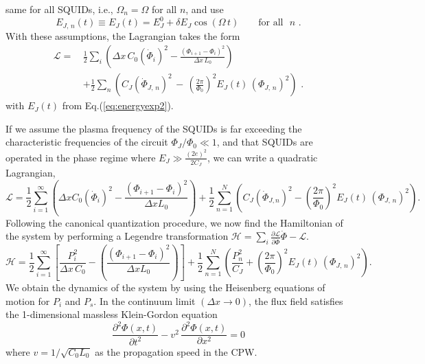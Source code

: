 same for all SQUIDs, i.e., $\Omega_n = \Omega$ for all $n$, and use 
%
\begin{equation} \label{eq:energyexp2}
E_{J,\,n}(t) \equiv E_J(t) = E_J^0 + \delta E_J \cos(\Omega \, t) \qquad \text{for all} \, \, \, \, n \, \, . 
\end{equation}
%
With these assumptions, the Lagrangian takes the form
%
\begin{equation} \label{eq:lagn3}
\begin{split}
\mathcal{L} = \, & \frac{1}{2} \sum_i \left( \Delta x \, C_{0} \left(\dot{\Phi}_{i}\right)^{2} - 
\frac{\left(\Phi_{i+1}-\Phi_{i}\right)^{2}}{\Delta x \, L_{0}} \right)  \\[2mm]
& + \frac{1}{2} \sum_n \left( C_J \left(\dot{\Phi}_{J,\,n} \right)^{2} \, - \, 
 \left(\frac{2 \pi}{\Phi_0} \right)^2 E_J(t) \, \left( \Phi_{J,\,n} \right)^2 
\right) \, \, .
\end{split}
\end{equation}
%
with $E_J(t)$ from Eq.(\ref{eq:energyexp2}). 

\color{black}

If we assume the plasma frequency of the SQUIDs is far exceeding the characteristic frequencies of the circuit
$\Phi_J/\Phi_0 \ll 1$, and that SQUIDs are operated in the phase regime where $E_J \gg \frac{(2e)^2}{2C_J}$, we can write a quadratic Lagrangian, 
%
\begin{equation}
\mathcal{L}=\frac{1}{2}\sum_{i=1}^{\infty}\left(\Delta x C_{0} \left(\dot{\Phi}_{i}\right)^{2} - 
\frac{\left(\Phi_{i+1}-\Phi_{i}\right)^{2}}{\Delta x L_{0}}\right) %
 + \frac{1}{2} \sum_{n=1}^{N}\left(C_J\left(\dot{\Phi}_{J, n}\right)^{2}-\left(\frac{2\pi}{\Phi_{0}}\right)^{2} E_J(t) \, \left( \Phi_{J,\,n} \right)^2 \right).
\end{equation}
%
Following the canonical quantization procedure, we now find the Hamiltonian of the system by performing a Legendre transformation $\mathcal{H}=\sum_{i}\frac{\partial\mathcal{L}}{\partial\dot{\Phi}} \dot{\Phi} - \mathcal{L}$.
%
\begin{equation}
\mathcal{H}=\frac{1}{2}\sum_{i=1}^{\infty}\left[\frac{P_i^2}{\Delta x \, C_{0}} -\left(\frac{\left(\Phi_{i+1}-\Phi_{i}\right)^{2}}{\Delta x L_{0}}\right)\right] 
 + \frac{1}{2} \sum_{n=1}^{N}\left(\frac{P_n^2}{C_J}+\left(\frac{2\pi}{\Phi_{0}}\right)^{2} E_J(t) \, \left( \Phi_{J,\,n} \right)^2 \right).
\end{equation}
%
We obtain the dynamics of the system by using the Heisenberg equations of motion for $P_i$ and $P_s$. 
In the \color{blue} continuum limit
$(\Delta x \to 0)$, the flux field satisfies the 1-dimensional massless Klein-Gordon equation
%
\begin{equation}
\frac{\partial^2\Phi(x,t)}{\partial t^2} - v^2 \, \frac{\partial^2\Phi(x,t)}{\partial x^2} = 0
\end{equation}
%
\color{blue}
where $v = 1 / \sqrt{C_0 L_0}$ as the propagation speed in the CPW.
\color{black}

